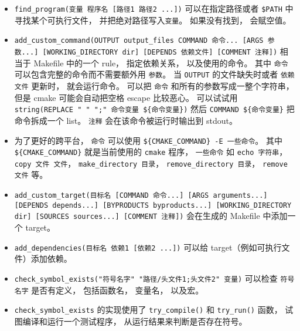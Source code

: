 \begin{itemize}
\item \verb|find_program(变量 程序名 [路径1 路径2 ...])| 可以在指定路径或者 \verb|$PATH| 中寻找某个可执行文件， 并把绝对路径写入\verb|变量|。 如果没有找到， 会赋空值。
\item \verb|add_custom_command(OUTPUT output_files COMMAND 命令... [ARGS 参数...] [WORKING_DIRECTORY dir] [DEPENDS 依赖文件] [COMMENT 注释])| 相当于 Makefile 中的一个 rule， 指定依赖关系， 以及使用的命令。 其中 \verb|命令| 可以包含完整的命令而不需要额外用 \verb|参数|。 当 \verb|OUTPUT| 的文件缺失时或者 \verb|依赖文件| 更新时， 就会运行命令。 可以把 \verb|命令| 和所有的参数写成一整个字符串， 但是 cmake 可能会自动把空格 escape 比较恶心。 可以试试用 \verb|string(REPLACE " " ";" 命令变量 ${命令变量})| 然后 \verb|COMMAND ${命令变量}| 把命令拆成一个 list。 \verb|注释| 会在该命令被运行时输出到 stdout。
\item 为了更好的跨平台， \verb|命令| 可以使用 \verb|${CMAKE_COMMAND} -E 一些命令|。 其中 \verb|${CMAKE_COMMAND}| 就是当前使用的 \verb|cmake| 程序， \verb|一些命令| 如 \verb|echo 字符串|，\verb|copy 文件 文件|， \verb|make_directory 目录|， \verb|remove_directory 目录|， \verb|remove 文件| 等。
\item \verb|add_custom_target(目标名 [COMMAND 命令...] [ARGS arguments...] [DEPENDS depends...] [BYPRODUCTS byproducts...] [WORKING_DIRECTORY dir] [SOURCES sources...] [COMMENT 注释])| 会在生成的 Makefile 中添加一个 target。
\item \verb|add_dependencies(目标名 依赖1 [依赖2 ...])| 可以给 target（例如可执行文件）添加依赖。
\item \verb|check_symbol_exists("符号名字" "路径/头文件1;头文件2" 变量)| 可以检查 \verb|符号名字| 是否有定义， 包括函数名， 变量名， 以及宏。
\item \verb|check_symbol_exists| 的实现使用了 \verb|try_compile()| 和 \verb|try_run()| 函数， 试图编译和运行一个测试程序， 从运行结果来判断是否存在符号。
\end{itemize}

